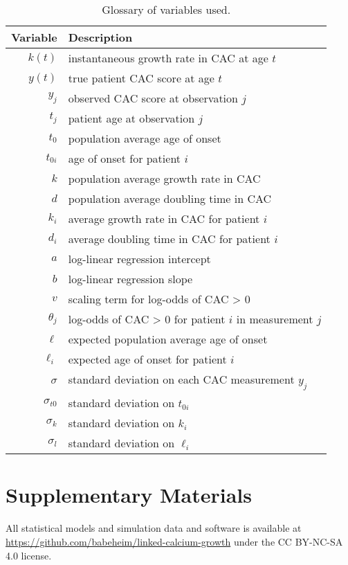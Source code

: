 \documentclass[a4paper, 10pt]{article}
\begin{document}
\begin{table}[h]
  \caption{Glossary of variables used.}
  \centering
  \begin{tabular}{rl}
    \toprule
    Variable     & Description  \\
    \midrule
    $k(t)$     & instantaneous growth rate in CAC at age $t$ \\
    $y(t)$     & true patient CAC score at age $t$ \\
    $y_j$     & observed CAC score at observation $j$ \\
    $t_j$     & patient age at observation $j$  \\
    $t_0$     & population average age of onset  \\
    $t_{0i}$     & age of onset for patient $i$ \\
    $k$     & population average growth rate in CAC \\
    $d$     & population average doubling time in CAC \\
    $k_i$     & average growth rate in CAC for patient $i$ \\
    $d_i$     & average doubling time in CAC for patient $i$ \\
    $a$     & log-linear regression intercept \\
    $b$     & log-linear regression slope \\
    $v$     & scaling term for log-odds of CAC > 0 \\
    $\theta_j$     & log-odds of CAC > 0 for patient $i$ in measurement $j$ \\
    $\ell$ & expected population average age of onset \\
    $\ell_i$     & expected age of onset for patient $i$ \\
    $\sigma$     & standard deviation on each CAC measurement $y_j$ \\
    $\sigma_{t0}$     & standard deviation on $t_{0i}$ \\
    $\sigma_{k}$     & standard deviation on $k_{i}$ \\
    $\sigma_{l}$     & standard deviation on $\ell_{i}$ \\
    \bottomrule
  \end{tabular}
  \label{tab:variableGlossary}
\end{table}


\section{Supplementary Materials}

All statistical models and simulation data and software is available at \href{https://github.com/babeheim/linked-calcium-growth}{https://github.com/babeheim/linked-calcium-growth} under the CC BY-NC-SA 4.0 license.

\printbibliography[title={References}]
\end{document}
